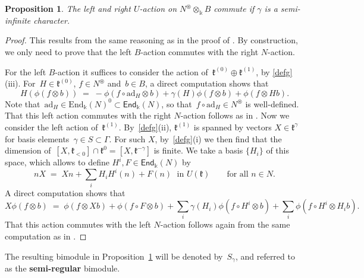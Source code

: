 \documentclass[11pt]{amsart}
\newcommand{\fEnd}{{\mathsf{End}}}
\newcommand{\ad}{\mathrm{ad}}
\newcommand{\Hom}{\mathrm{Hom}}
\newcommand{\End}{\mathrm{End}}
\newcommand{\mk}{\Bbbk}
\newcommand{\fk}{\mathfrak{k}}
\numberwithin{equation}{section}
\theoremstyle{plain}
\newtheorem{prop}[subsubsection]{Proposition}
\theoremstyle{remark}
\theoremstyle{remark}
\theoremstyle{construction}
\begin{document}
\begin{prop}\label{PropBM}
The left and right $U$-action on $N^{\circledast}\otimes_{\mk}B$ commute if $\gamma$ is a semi-infinite character. 
\end{prop}
\begin{proof}
This results from the same reasoning as in the proof of \cite[Theorem~1.3]{Soergel}. 
By construction, we only need to prove that the left $B$-action commutes with the right $N$-action.




For the left $B$-action it suffices to consider the action of~$\fk^{(0)}\oplus \fk^{(1)}$, by \ref{defg}(iii). For~$H\in \fk^{(0)}$, $f\in N^{\circledast}$ and~$b\in B$, a direct computation shows that
\begin{equation}\label{eqHact}H(\phi(f\otimes b))\;=\; -\phi(f\circ\ad_H\otimes b)+\gamma(H)\phi(f\otimes b)+\phi(f\otimes Hb).\end{equation}
Note that~$\ad_H\in \End_{\mk}(N)^{0} \subset\fEnd_{\mk}(N)$, so that~$f\circ\ad_H\in N^{\circledast}$ is well-defined. That this left action commutes with the right $N$-action follows as in \cite[Theorem~1.3]{Soergel}.
Now we consider the left action of~$\fk^{(1)}$. By~\ref{defg}(ii), $\fk^{(1)}$ is spanned by vectors $X\in \fk^{\gamma}$ for basis elements~$\gamma\in S\subset\Gamma$. For such $X$, by~\ref{defg}(i) we then find that the dimension of~$[X,\fk_{<0}]\cap\fk^0=[X,\fk^{-\gamma}]$ is finite. We take a basis $\{H_i\}$ of this space, which allows to define  $H^i, F\in\fEnd_{\mk}(N)$ by
$$nX\;=\; Xn+\sum_i H_iH^i(n)+F(n)\;\mbox{ in $U(\fk)$}\qquad\mbox{for all $n\in N$}.$$
A direct computation shows that
\begin{equation}\label{eqXact}X\phi(f\otimes b)\;=\;\phi(f\otimes Xb)+\phi(f\circ F\otimes b)+\sum_i\gamma(H_i)\phi(f\circ H^i\otimes b)+\sum_i\phi(f\circ H^i\otimes H_ib).\end{equation}
That this action commutes with the left $N$-action follows again from the same computation as in \cite[Theorem~1.3]{Soergel}.
\end{proof}

The resulting bimodule in Proposition~\ref{PropBM} will be denoted by~$S_{\gamma}$, and referred to as the {\bf semi-regular} bimodule. %
\end{document}
